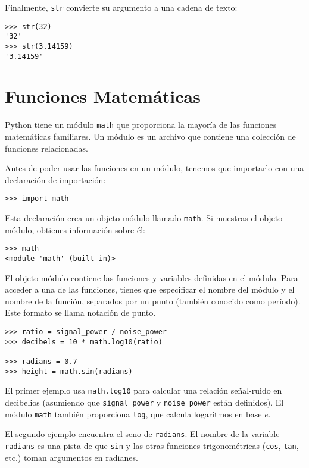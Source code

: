 \documentclass[12pt,letterpaper]{book}
\begin{document}
Finalmente, \texttt{str} convierte su argumento a una cadena de texto:

\begin{lstlisting}
>>> str(32)
'32'
>>> str(3.14159)
'3.14159'
\end{lstlisting}

\section{Funciones Matemáticas}

Python tiene un módulo \texttt{math} que proporciona la mayoría de las funciones matemáticas familiares. Un módulo es un archivo que contiene una colección de funciones relacionadas.

Antes de poder usar las funciones en un módulo, tenemos que importarlo con una declaración de importación:

\begin{lstlisting}
>>> import math
\end{lstlisting}

Esta declaración crea un objeto módulo llamado \texttt{math}. Si muestras el objeto módulo, obtienes información sobre él:

\begin{lstlisting}
>>> math
<module 'math' (built-in)>
\end{lstlisting}

El objeto módulo contiene las funciones y variables definidas en el módulo. Para acceder a una de las funciones, tienes que especificar el nombre del módulo y el nombre de la función, separados por un punto (también conocido como período). Este formato se llama notación de punto.

\begin{lstlisting}
>>> ratio = signal_power / noise_power
>>> decibels = 10 * math.log10(ratio)

>>> radians = 0.7
>>> height = math.sin(radians)
\end{lstlisting}

El primer ejemplo usa \texttt{math.log10} para calcular una relación señal-ruido en decibelios (asumiendo que \texttt{signal\_power} y \texttt{noise\_power} están definidos). El módulo \texttt{math} también proporciona \texttt{log}, que calcula logaritmos en base $e$.

El segundo ejemplo encuentra el seno de \texttt{radians}. El nombre de la variable \texttt{radians} es una pista de que \texttt{sin} y las otras funciones trigonométricas (\texttt{cos}, \texttt{tan}, etc.) toman argumentos en radianes.
\end{document}
